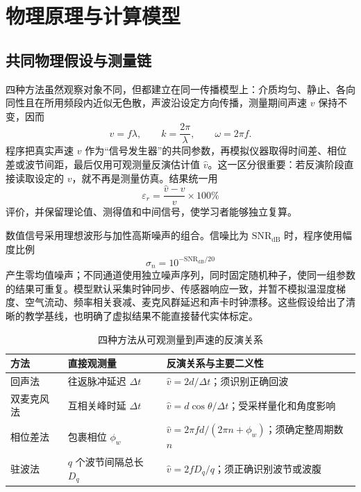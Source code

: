 \documentclass[UTF8,a4paper,zihao=-4]{ctexart}
\begin{document}
\section{物理原理与计算模型}

\subsection{共同物理假设与测量链}
四种方法虽然观察对象不同，但都建立在同一传播模型上：介质均匀、静止、各向同性且在所用频段内近似无色散，声波沿设定方向传播，测量期间声速 $v$ 保持不变，因而
\begin{equation}
 v=f\lambda,\qquad k=\frac{2\pi}{\lambda},\qquad \omega=2\pi f.
 \label{eq:sound-wave}
\end{equation}
程序把真实声速 $v$ 作为“信号发生器”的共同参数，再模拟仪器取得时间差、相位差或波节间距，最后仅用可观测量反演估计值 $\hat v$。这一区分很重要：若反演阶段直接读取设定的 $v$，就不再是测量仿真。结果统一用
\begin{equation}
 \varepsilon_r=\frac{\hat v-v}{v}\times100\%
 \label{eq:sound-relative-error}
\end{equation}
评价，并保留理论值、测得值和中间信号，使学习者能够独立复算。

数值信号采用理想波形与加性高斯噪声的组合。信噪比为 $\mathrm{SNR}_{\mathrm{dB}}$ 时，程序使用幅度比例
\begin{equation}
 \sigma_n=10^{-\mathrm{SNR}_{\mathrm{dB}}/20}
 \label{eq:sound-noise}
\end{equation}
产生零均值噪声；不同通道使用独立噪声序列，同时固定随机种子，使同一组参数的结果可重复。模型默认采集时钟同步、传感器响应一致，并暂不模拟温湿度梯度、空气流动、频率相关衰减、麦克风群延迟和声卡时钟漂移。这些假设给出了清晰的教学基线，也明确了虚拟结果不能直接替代实体标定。

\begin{table}[!htb]
\centering
\caption{四种方法从可观测量到声速的反演关系}
\begin{tabularx}{\textwidth}{p{24mm}X X}
\toprule
方法 & 直接观测量 & 反演关系与主要二义性\\
\midrule
回声法 & 往返脉冲延迟 $\Delta t$ & $\hat v=2d/\Delta t$；须识别正确回波\\
双麦克风法 & 互相关峰时延 $\Delta t$ & $\hat v=d\cos\theta/\Delta t$；受采样量化和角度影响\\
相位差法 & 包裹相位 $\phi_w$ & $\hat v=2\pi fd/(2\pi n+\phi_w)$；须确定整周期数 $n$\\
驻波法 & $q$ 个波节间隔总长 $D_q$ & $\hat v=2fD_q/q$；须正确识别波节或波腹\\
\bottomrule
\end{tabularx}
\end{table}
\end{document}
